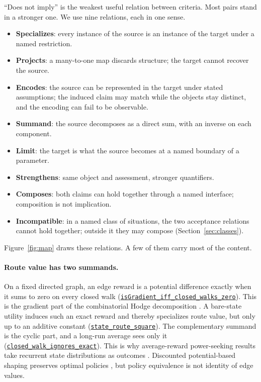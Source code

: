 \documentclass[11pt]{article}
\newcommand{\lean}[1]{\hyperref[lean:#1]{\nolinkurl{#1}}}
\begin{document}
``Does not imply'' is the weakest useful relation between criteria.
Most pairs stand in a stronger one.
We use nine relations, each in one sense.
\begin{itemize}[leftmargin=1.5em,itemsep=0pt]
  \item \textbf{Specializes}: every instance of the source is an instance of the target under a named restriction.
  \item \textbf{Projects}: a many-to-one map discards structure; the target cannot recover the source.
  \item \textbf{Encodes}: the source can be represented in the target under stated assumptions; the induced claim may match while the objects stay distinct, and the encoding can fail to be observable.
  \item \textbf{Summand}: the source decomposes as a direct sum, with an inverse on each component.
  \item \textbf{Limit}: the target is what the source becomes at a named boundary of a parameter.
  \item \textbf{Strengthens}: same object and assessment, stronger quantifiers.
  \item \textbf{Composes}: both claims can hold together through a named interface; composition is not implication.
  \item \textbf{Incompatible}: in a named class of situations, the two acceptance relations cannot hold together; outside it they may compose (Section~\ref{sec:classes}).
\end{itemize}

Figure~\ref{fig:map} draws these relations.
A few of them carry most of the content.

\paragraph{Route value has two summands.}
On a fixed directed graph, an edge reward is a potential difference exactly when it sums to zero on every closed walk (\lean{isGradient_iff_closed_walks_zero}).
This is the gradient part of the combinatorial Hodge decomposition \parencite{jiang2011hodgerank,lim2020hodge}.
A bare-state utility induces such an exact reward and thereby specializes route value, but only up to an additive constant (\lean{state_route_square}).
The complementary summand is the cyclic part, and a long-run average sees only it (\lean{closed_walk_ignores_exact}).
This is why average-reward power-seeking results take recurrent state distributions as outcomes \parencite{turner2021seekpower}.
Discounted potential-based shaping preserves optimal policies \parencite{ng1999shaping}, but policy equivalence is not identity of edge values.
\end{document}
